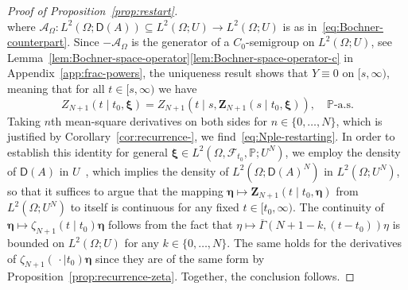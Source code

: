 \documentclass[reqno]{amsart}
\numberwithin{equation}{section}
\newcommand{\bbP}{\mathbb{P}}
\newcommand{\cA}{\mathcal{A}}
\newcommand{\cF}{\mathcal{F}}
\newcommand{\from}{\colon}
\theoremstyle{remark}
\theoremstyle{definition}
\begin{document}
\begin{proof}[Proof of Proposition~\ref{prop:restart}]
\begin{equation}
	\end{equation}
	where $\cA_\Omega \from L^2(\Omega; \mathsf D(A)) \subseteq L^2(\Omega; U) \to L^2(\Omega; U)$ is as in~\eqref{eq:Bochner-counterpart}.
	Since $-\cA_\Omega$ is the generator of a $C_0$-semigroup on
	$L^2(\Omega; U)$, see Lemma~\ref{lem:Bochner-space-operator}\ref{lem:Bochner-space-operator-c} in Appendix~\ref{app:frac-powers},
	the uniqueness result \cite[Chapter~4, Theorem~1.3]{Pazy1983}
	shows that $Y \equiv 0$ on $[s, \infty)$, 
	meaning that for all $t \in [s, \infty)$ we have
	\begin{equation}
		Z_{N+1}(t \mid t_0, \bm{\xi}) 
		= 
		Z_{N+1}(t \mid s, \mathbf Z_{N+1}(s \mid t_0, \bm\xi) ),
		\quad 
		\bbP\text{-a.s.}
	\end{equation}
	Taking $n$th mean-square derivatives on both sides for $n \in \{0, \dots, N\}$,
	which is justified by Corollary~\ref{cor:recurrence-}, 
	we find~\eqref{eq:Nple-restarting}. In order to establish this identity
	for general $\bm\xi \in L^2(\Omega, \cF_{t_0},\bbP; U^N)$, we employ the
	density of $\mathsf D(A)$ in $U$~\cite[Chapter~1, Corollary~2.5]{Pazy1983},
	which implies the density of $L^2(\Omega; \mathsf D(A)^N)$ in $L^2(\Omega; U^N)$,
	so that it suffices to argue that the mapping 
	$\bm \eta \mapsto \mathbf Z_{N+1}(t \mid t_0, \bm\eta)$ from $L^2(\Omega; U^N)$ to itself is continuous
	for any fixed $t \in [t_0, \infty)$.
	The continuity of $\bm\eta \mapsto \zeta_{N+1}(t \mid t_0)\bm\eta$ 
	follows from the fact that $\eta \mapsto \overline\Gamma(N+1-k, (t-t_0)) \eta$
	is bounded on $L^2(\Omega; U)$ for any $k \in \{0, \dots, N\}$.
	The same holds for the derivatives of $\zeta_{N+1}(\,\cdot \mid t_0)\bm\eta$ 
	since they are
	of the same form by Proposition~\ref{prop:recurrence-zeta}.
	Together, the conclusion follows.
\end{proof}
\end{document}
